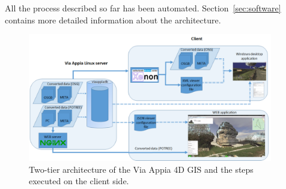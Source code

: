 All the process described so far has been automated. Section~\ref{sec:software} contains
more detailed information about the architecture. 


\begin{figure}[H] \centering
\includegraphics[width=0.95\textwidth]{fig/system_architecture/TwoTierArchitecture.pdf}
\caption{Two-tier architecture of the Via Appia 4D GIS and the steps
executed on the client side.} \label{fig:sys_arch_2tier} \end{figure}
